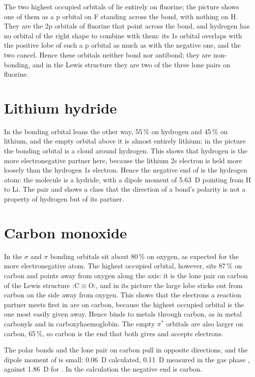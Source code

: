 The two highest occupied orbitals of  lie entirely on fluorine; the picture shows one of them as a p orbital on F standing across the bond, with nothing on H. They are the 2p orbitals of fluorine that point across the bond, and hydrogen has no orbital of the right shape to combine with them: its 1s orbital overlaps with the positive lobe of such a p orbital as much as with the negative one, and the two cancel. Hence these orbitals neither bond nor antibond; they are non-bonding, and in the Lewis structure they are two of the three lone pairs on fluorine.

\section{Lithium hydride}
In  the bonding orbital leans the other way, 55\,\% on hydrogen and 45\,\% on lithium, and the empty orbital above it is almost entirely lithium; in the picture the bonding orbital is a cloud around hydrogen. This shows that hydrogen is the more electronegative partner here, because the lithium 2s electron is held more loosely than the hydrogen 1s electron. Hence the negative end of  is the hydrogen atom: the molecule is a hydride, with a dipole moment of 5.63~D pointing from H to Li. The pair  and  shows a class that the direction of a bond's polarity is not a property of hydrogen but of its partner.

\section{Carbon monoxide}
In  the $\sigma$ and $\pi$ bonding orbitals sit about 80\,\% on oxygen, as expected for the more electronegative atom. The highest occupied orbital, however, sits 87\,\% on carbon and points away from oxygen along the axis: it is the lone pair on carbon of the Lewis structure :C$\equiv$O:, and in its picture the large lobe sticks out from carbon on the side away from oxygen. This shows that the electrons a reaction partner meets first in  are on carbon, because the highest occupied orbital is the one most easily given away. Hence  binds to metals through carbon, as in metal carbonyls and in carboxyhaemoglobin. The empty $\pi^*$ orbitals are also larger on carbon, 65\,\%, so carbon is the end that both gives and accepts electrons.

The polar bonds and the lone pair on carbon pull in opposite directions, and the dipole moment of  is small: 0.06~D calculated, 0.11~D measured in the gas phase \cite{cccbdb}, against 1.86~D for . In the calculation the negative end is carbon.

